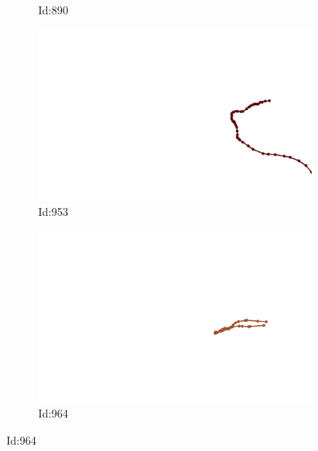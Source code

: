 \documentclass[12pt,twoside]{report}
\begin{document}
\begin{figure}
\begin{subfigure}[b]{0.20\textwidth}
\caption{Id:890}
\end{subfigure}
\begin{subfigure}[b]{0.20\textwidth}
\centering
\includegraphics[width=\textwidth]{../../trajectories/953.png}
\caption{Id:953}
\end{subfigure}
\begin{subfigure}[b]{0.20\textwidth}
\centering
\includegraphics[width=\textwidth]{../../trajectories/964.png}
\caption{Id:964}
\end{subfigure}
\end{figure}
\end{document}
